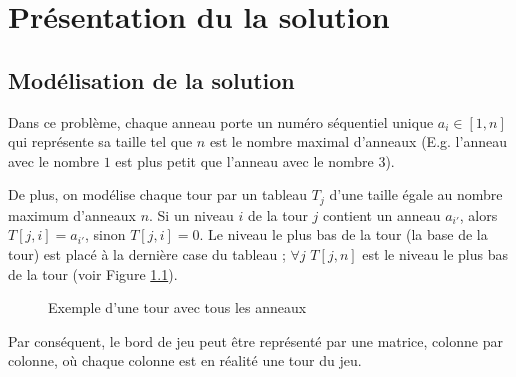 \chapter{Présentation du la solution}

\section{Modélisation de la solution}
Dans ce problème, chaque anneau porte un numéro séquentiel unique $a_i \in [1, n]$ qui représente sa taille tel que $n$ est le nombre maximal d'anneaux (E.g. l'anneau avec le nombre $1$ est plus petit que l'anneau avec le nombre $3$).
\par
De plus, on modélise chaque tour par un tableau $T_j$ d'une taille égale au nombre maximum d'anneaux $n$. Si un niveau $i$ de la tour $j$ contient un anneau $a_{i'}$, alors $T[j, i] = a_{i'}$, sinon $T[j, i] = 0$. Le niveau le plus bas de la tour (la base de la tour) est placé à la dernière case du tableau ; $\forall j$ $T[j, n]$ est le niveau le plus bas de la tour (voir Figure \ref{fig:rep_tour}).

\begin{figure}[h!]
    \begin{center}
        \caption{Exemple d'une tour avec tous les anneaux}
        \label{fig:rep_tour}
    \end{center}
\end{figure}

\par
Par conséquent, le bord de jeu peut être représenté par une matrice, colonne par colonne, où chaque colonne est en réalité une tour du jeu.

